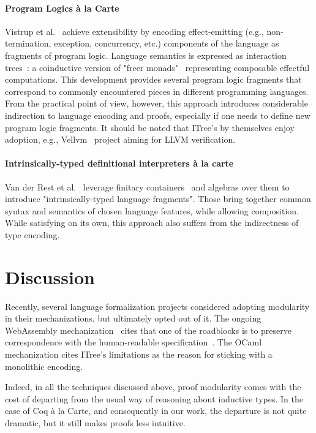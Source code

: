 \documentclass[sigplan,nonacm,review]{acmart}
\begin{document}
\paragraph{Program Logics à la Carte}
Vistrup et al.~\cite{vistrup2025program} achieve extensibility by encoding effect-emitting
(e.g., non-termination, exception, concurrency, etc.)
components of the language as fragments of program logic. 
Language semantics is expressed as interaction trees~\cite{xia2019interaction}: a coinductive version of "freer monads"~\cite{kiselyov2015freer} representing composable effectful computations. 
This development provides several program logic fragments that correspond to commonly encountered pieces in different programming languages. 
%
%
%
%
From the practical point of view, however, this approach introduces considerable indirection to language encoding and proofs, especially if one needs to define new program logic fragments. It should be noted that ITree's by themselves enjoy adoption, e.g., Vellvm~\cite{zhao2012formalizing} project aiming for LLVM verification.

\paragraph{Intrinsically-typed definitional interpreters {\`a} la carte}
Van der Rest et al.~\cite{van2022intrinsically} leverage finitary containers~\cite{altenkirch2015indexed} and algebras over them to introduce "intrinsically-typed language fragments".
Those bring together common syntax and semantics of chosen language features, while allowing composition. 
%
%
%
%
While satisfying on its own, this approach also suffers from the indirectness of type encoding. 

\section{Discussion}

Recently, several language formalization projects considered adopting modularity in their mechanizations, but ultimately opted out of it. The ongoing WebAssembly mechanization~\cite{rao2025progressful} cites that one of the roadblocks is to preserve correspondence with the human-readable specification~\cite{WebAssemblyCoreSpecification1}. The OCaml~\cite{seassau2025formal} mechanization cites ITree's limitations as the reason for sticking with a monolithic encoding.

Indeed, in all the techniques discussed above, proof modularity comes with the cost of departing from the usual way of reasoning about inductive types. In the case of Coq à la Carte, and consequently in our work, the departure is not quite dramatic, but it still makes proofs less intuitive. 
\end{document}
